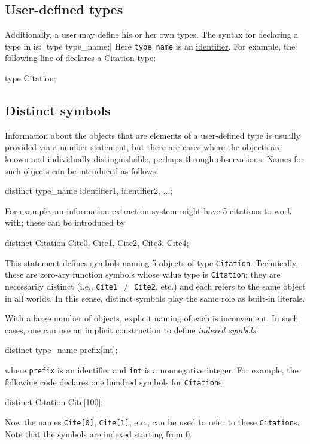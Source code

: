 \documentclass[12pt]{article}
\begin{document}
\subsection{User-defined types}\label{user-type-section}

Additionally, a user may define his or her own types.  The syntax for declaring a type in \bl is:
\blog|type type_name;|
Here \verb|type_name| is an \hyperref[identifier-section]{identifier}. 
For example, the following line of \bl declares a Citation type:
\begin{blogcode}
type Citation;
\end{blogcode}

\subsection{Distinct symbols} \label{distinct-section}
Information about the objects that are elements of a user-defined type
is usually provided via a \hyperref[number-section]{number statement}, but there are cases
where the objects are known and individually distinguishable, perhaps through observations.
Names for such objects can be introduced as follows:
\begin{blogcode}
distinct type_name identifier1, identifier2, ...;
\end{blogcode}
For example, an information extraction system might have 5 citations to work with;
these can be introduced by
\begin{blogcode}
distinct Citation Cite0, Cite1, Cite2, Cite3, Cite4;
\end{blogcode}
This statement defines symbols naming 5 objects of type {\tt Citation}.
Technically, these are zero-ary function symbols whose value type is {\tt Citation};
they are necessarily distinct  (i.e., {\tt Cite1} $\neq$ {\tt Cite2}, etc.)
and each refers to the same object in all worlds. In this sense,
distinct symbols play the same role as built-in literals.

With a large number of objects, explicit naming of each is inconvenient.
In such cases, one can use an implicit construction to define {\em indexed symbols}:
\begin{blogcode}
distinct type_name prefix[int];
\end{blogcode}
where {\tt prefix} is an identifier and {\tt int} is a nonnegative integer.
For example, the following \bl code declares one hundred symbols for {\tt Citation}s:
\begin{blogcode}
distinct Citation Cite[100];
\end{blogcode}
Now the names \verb|Cite[0]|, \verb|Cite[1]|, etc., can be used to refer to these {\tt Citation}s. Note that the symbols are indexed starting from 0.
\end{document}

